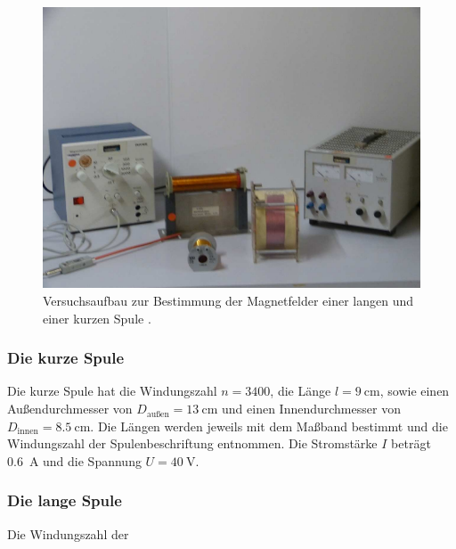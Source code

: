 \begin{figure}
    \centering
    \includegraphics[]{abbildungen/lange und kurze spule.png}
    \caption[]{Versuchsaufbau zur Bestimmung der Magnetfelder einer langen und einer kurzen Spule \cite[]{man:v308}.}
    \label{fig:lange_kurze_spule}
\end{figure}

\subsubsection{Die kurze Spule}
Die kurze Spule hat die Windungszahl $n = 3400$, die Länge $l = \qty[]{9}{\cm}$, sowie einen Außendurchmesser von 
$D_\text{außen} = \qty[]{13}{\cm}$ und einen Innendurchmesser von $D_\text{innen} = \qty[]{8.5}{\cm}$.
Die Längen werden jeweils mit dem Maßband bestimmt und die Windungszahl der Spulenbeschriftung entnommen.
Die Stromstärke $I$ beträgt \qty[]{0.6}{\ampere} und die Spannung $U = \qty[]{40}{\volt}$.


\subsubsection{Die lange Spule}
Die Windungszahl der 
